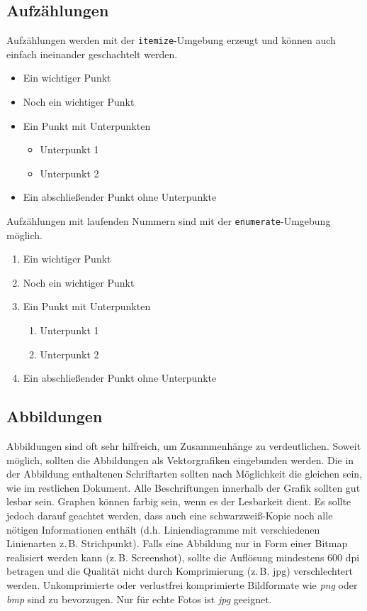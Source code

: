 \documentclass[conference,compsoc,final,a4paper]{IEEEtran}
\begin{document}
\subsection{Aufzählungen}
Aufzählungen werden mit der \texttt{itemize}-Umgebung erzeugt und können auch einfach ineinander geschachtelt werden.

\begin{itemize}
  \item Ein wichtiger Punkt
  \item Noch ein wichtiger Punkt
  \item Ein Punkt mit Unterpunkten
    \begin{itemize}
      \item Unterpunkt 1
      \item Unterpunkt 2
    \end{itemize}
  \item Ein abschließender Punkt ohne Unterpunkte
\end{itemize}

Aufzählungen mit laufenden Nummern sind mit der \texttt{enumerate}-Umgebung möglich.

\begin{enumerate}
  \item Ein wichtiger Punkt
  \item Noch ein wichtiger Punkt
  \item Ein Punkt mit Unterpunkten
    \begin{enumerate}
      \item Unterpunkt 1
      \item Unterpunkt 2
    \end{enumerate}
  \item Ein abschließender Punkt ohne Unterpunkte
\end{enumerate}

\subsection{Abbildungen}
Abbildungen sind oft sehr hilfreich, um Zusammenhänge zu verdeutlichen. Soweit möglich, sollten die Abbildungen als Vektorgrafiken eingebunden werden. Die in der Abbildung enthaltenen Schriftarten sollten nach Möglichkeit die gleichen sein, wie im restlichen Dokument. Alle Beschriftungen innerhalb der Grafik sollten gut lesbar sein.
Graphen können farbig sein, wenn es der Lesbarkeit dient. Es sollte jedoch darauf geachtet werden, dass auch eine schwarz\-weiß-Kopie noch alle nötigen Informationen enthält (d.h. Liniendiagramme mit verschiedenen Linienarten z.\,B. Strichpunkt).
Falls eine Abbildung nur in Form einer Bitmap realisiert werden kann (z.\,B. Screenshot), sollte die Auflösung mindestens 600 dpi betragen und die Qualität nicht durch Komprimierung (z.\,B. jpg) verschlechtert werden. Unkomprimierte oder verlustfrei komprimierte Bildformate wie \emph{png} oder \emph{bmp} sind zu bevorzugen. Nur für echte Fotos ist \emph{jpg} geeignet.
\end{document}
